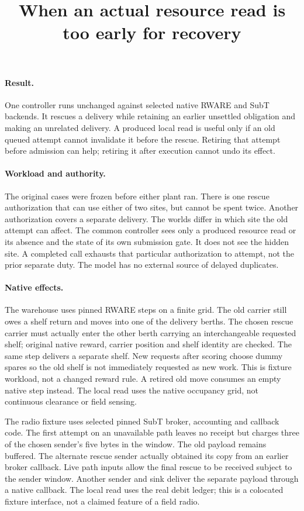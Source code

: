 \documentclass{article}
\title{When an actual resource read is too early for recovery}
\begin{document}
\maketitle

\paragraph{Result.}
One controller runs unchanged against selected native RWARE and SubT
backends. It rescues a delivery while retaining an earlier
unsettled obligation and making an unrelated delivery. A produced
local read is useful only if an old queued attempt cannot
invalidate it before the rescue. Retiring that attempt before
admission can help; retiring it after execution cannot undo its effect.

\paragraph{Workload and authority.}
The original cases were frozen before either plant ran. There is
one rescue authorization that can use either of two sites, but
cannot be spent twice. Another authorization covers a separate
delivery. The worlds differ in which site the old attempt can
affect. The common controller sees only a produced resource read
or its absence and the state of its own submission gate. It
does not see the hidden site. A completed call exhausts that
particular authorization to attempt, not the prior separate duty.
The model has no external source of delayed duplicates.

\paragraph{Native effects.}
The warehouse uses pinned RWARE steps on a finite grid. The old
carrier still owes a shelf return and moves into one of the delivery
berths. The chosen rescue carrier must actually enter the other
berth carrying an interchangeable requested shelf; original native
reward, carrier position and shelf identity are checked. The same
step delivers a separate shelf. New requests after scoring choose
dummy spares so the old shelf is not immediately requested as new
work. This is fixture workload, not a changed reward rule. A retired
old move consumes an empty native step instead. The local read uses
the native occupancy grid, not continuous clearance or field sensing.

The radio fixture uses selected pinned SubT broker, accounting and
callback code. The first attempt on an unavailable path leaves no
receipt but charges three of the chosen sender's five bytes in the
window. The old payload remains buffered. The alternate rescue
sender actually obtained its copy from an earlier broker callback.
Live path inputs allow the final rescue to be received subject to
the sender window. Another sender and sink deliver the separate
payload through a native callback. The local read uses the
real debit ledger; this is a colocated fixture interface, not a
claimed feature of a field radio.
\end{document}
